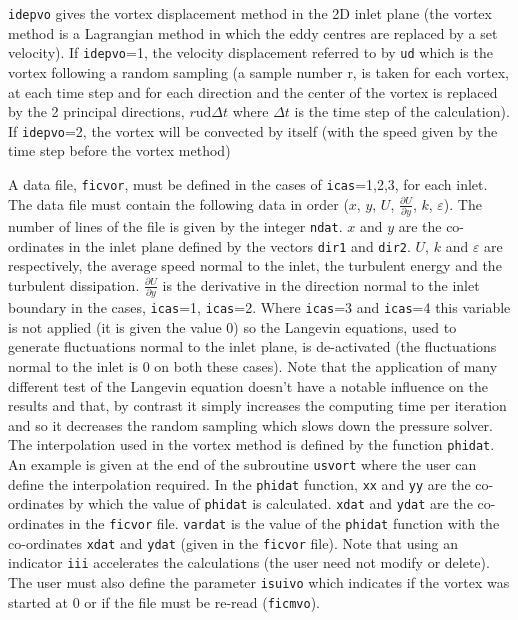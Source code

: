 {{{\begin{list}{-}{}
\begin{list}{*}{}
\item \texttt{idepvo} gives the vortex displacement method in the 2D inlet plane
  (the vortex method is a Lagrangian method in which the eddy centres are
  replaced by a set velocity). If \texttt{idepvo}=1, the velocity displacement
  referred to by \texttt{ud} which is the vortex following a random sampling
  (a sample number r, is taken for each vortex, at each time step and for each direction and
  the center of the vortex is replaced by the 2 principal directions,
  $r \mbox{ud} \Delta t$ where $\Delta t$ is the time step of the calculation).
  If \texttt{idepvo}=2, the vortex will be convected by itself (with the speed
  given by the time step before the vortex method)
\end{list}

A data file, \texttt{ficvor}, must be defined in the cases of
\texttt{icas}=1,2,3, for each inlet. The data file must contain the following
data in order ($x$, $y$, $U$, $\displaystyle \frac{\partial U}
{\partial y}$, $k$, $\varepsilon$). The number of lines of the file is given by
the integer \texttt{ndat}. $x$ and $y$ are the co-ordinates in the inlet plane
defined by the vectors \texttt{dir1} and \texttt{dir2}. $U$, $k$ and
$\varepsilon$ are respectively, the average speed normal to the inlet,
the turbulent energy and the turbulent dissipation.
$\displaystyle \frac{\partial U}{\partial y}
$ is the derivative in the direction normal to the
 inlet boundary in the cases, \texttt{icas}=1, \texttt{icas}=2.
 Where \texttt{icas}=3 and \texttt{icas}=4 this variable is not applied
 (it is given the value 0) so the Langevin equations, used to generate
 fluctuations normal to the inlet plane, is de-activated
 (the fluctuations normal to the inlet is 0 on both these cases).
 Note that the application of
 many different test of the Langevin equation doesn't have a notable influence
 on the results and that, by contrast it simply increases the computing time per
 iteration and so it decreases the random sampling which slows down the pressure
 solver. The interpolation used in the vortex method is defined by the function
 \texttt{phidat}. An example is given at the end of the subroutine \texttt{usvort} where the
 user can define the interpolation required. In the \texttt{phidat} function,
 \texttt{xx} and \texttt{yy} are the co-ordinates by which the value of
 \texttt{phidat} is calculated. \texttt{xdat} and \texttt{ydat} are the
 co-ordinates in the \texttt{ficvor} file. \texttt{vardat} is the
 value of the \texttt{phidat} function with the co-ordinates \texttt{xdat}
 and \texttt{ydat} (given in the \texttt{ficvor} file). Note that using an
 indicator \texttt{iii} accelerates the calculations (the user need not modify or delete).
 The user must also define the parameter \texttt{isuivo} which indicates if the
 vortex was started at 0 or if the file must be re-read (\texttt{ficmvo}).


\end{list}}}}

